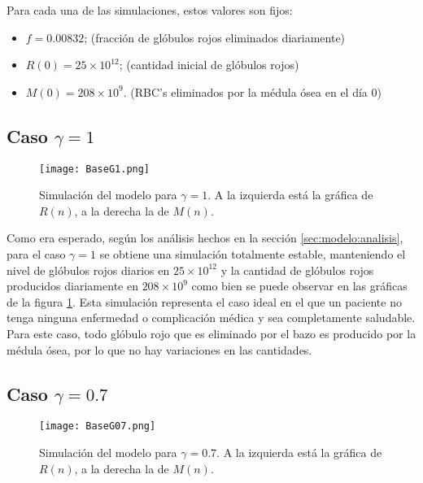 Para cada una de las simulaciones, estos valores son fijos:
\begin{itemize}
    \item $f=0.00832$; (fracción de glóbulos rojos eliminados diariamente)
    \item $R(0) = 25\times 10^{12}$; (cantidad inicial de glóbulos rojos)
    \item $M(0) = 208 \times 10^{9}$. (RBC's eliminados por la médula ósea en el día 0)
\end{itemize}

\subsection{Caso $\gamma=1$}\label{subsec:modelo:simulaciones:G1}
\begin{figure}[H]
    \centering
    \captionsetup{justification=centering}
    \texttt{[image: BaseG1.png]}
    \caption{Simulación del modelo para $\gamma = 1$. A la izquierda está la gráfica de $R(n)$, a la derecha la de $M(n)$.}
    \label{sec:modelo:fig:G1}
\end{figure}

Como era esperado, según los análisis hechos en la sección \ref{sec:modelo:analisis}, para el caso $\gamma = 1$ se obtiene una simulación totalmente estable, manteniendo el nivel de glóbulos rojos diarios en $25\times 10^{12}$ y la cantidad de glóbulos rojos producidos diariamente en $208\times 10^{9}$ como bien se puede observar en las gráficas de la figura \ref{sec:modelo:fig:G1}. Esta simulación representa el caso ideal en el que un paciente no tenga ninguna enfermedad o complicación médica y sea completamente saludable. Para este caso, todo glóbulo rojo que es eliminado por el bazo es producido por la médula ósea, por lo que no hay variaciones en las cantidades.

\subsection{Caso $\gamma=0.7$}
\begin{figure}[H]
    \centering
    \captionsetup{justification=centering}
    \texttt{[image: BaseG07.png]}
    \caption{Simulación del modelo para $\gamma = 0.7$. A la izquierda está la gráfica de $R(n)$, a la derecha la de $M(n)$.}
    \label{sec:modelo:fig:G07}
\end{figure}

